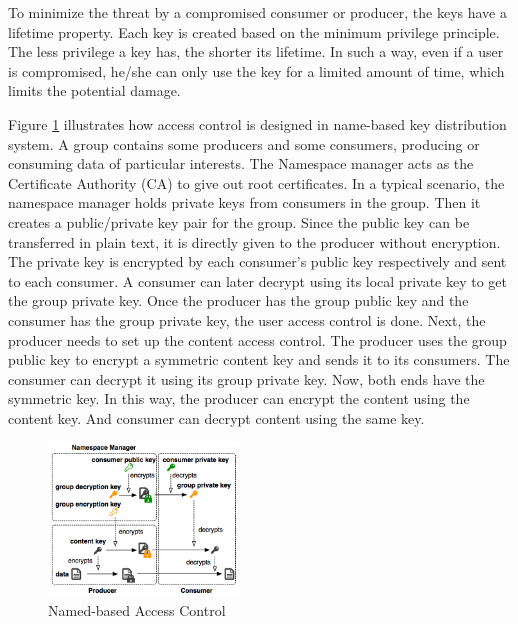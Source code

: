 \documentclass[conference,compsoc]{IEEEtran}
\begin{document}
To minimize the threat by a compromised consumer or producer, the keys \cite{yuconfidentiality} have a lifetime property. Each key is created based on the minimum privilege principle. The less privilege a key has, the shorter its lifetime. In such a way, even if a user is compromised, he/she can only use the key for a limited amount of time, which limits the potential damage.

Figure \ref{fig:access-control} illustrates how access control is designed in name-based key distribution system. A group contains some producers and some consumers, producing or consuming data of particular interests. The Namespace manager acts as the Certificate Authority (CA) to give out root certificates. In a typical scenario, the namespace manager holds private keys from consumers in the group. Then it creates a public/private key pair for the group. Since the public key can be transferred in plain text, it is directly given to the producer without encryption. The private key is encrypted by each consumer's public key respectively and sent to each consumer. A consumer can later decrypt using its local private key to get the group private key. Once the producer has the group public key and the consumer has the group private key, the user access control is done. Next, the producer needs to set up the content access control. The producer uses the group public key to encrypt a symmetric content key and sends it to its consumers. The consumer can decrypt it using its group private key. Now, both ends have the symmetric key. In this way, the producer can encrypt the content using the content key. And consumer can decrypt content using the same key.
\begin{figure}[!ht]
    \centering
    \includegraphics[width=0.45\textwidth]{images/key-distribution.png}
    \caption{Named-based Access Control \cite{yuconfidentiality}}
    \label{fig:access-control}
\end{figure}
\end{document}

